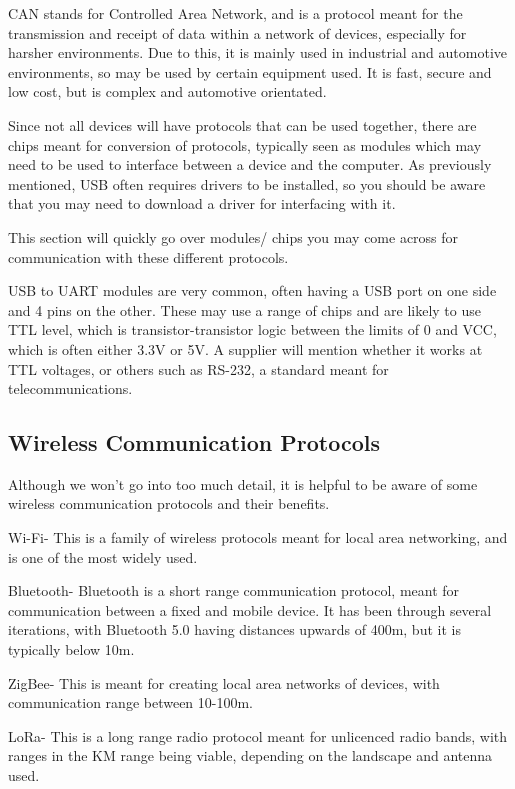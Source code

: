 \documentclass[a4paper,11pt]{report}
\begin{document}
CAN stands for Controlled Area Network, and is a protocol meant for the transmission and receipt of data within a network of devices, especially for harsher environments. Due to this, it is mainly used in industrial and automotive environments, so may be used by certain equipment used. It is fast, secure and low cost, but is complex and automotive orientated.


Since not all devices will have protocols that can be used together, there are chips meant for conversion of protocols, typically seen as modules which may need to be used to interface between a device and the computer. As previously mentioned, USB often requires drivers to be installed, so you should be aware that you may need to download a driver for interfacing with it.


This section will quickly go over modules/ chips you may come across for communication with these different protocols.

USB to UART modules are very common, often having a USB port on one side and 4 pins on the other. These may use a range of chips and are likely to use TTL level, which is transistor-transistor logic between the limits of 0 and VCC, which is often either 3.3V or 5V. A supplier will mention whether it works at TTL voltages, or others such as RS-232, a standard meant for telecommunications.

\subsection{Wireless Communication Protocols}

Although we won't go into too much detail, it is helpful to be aware of some wireless communication protocols and their benefits.

Wi-Fi- This is a family of wireless protocols meant for local area networking, and is one of the most widely used.

Bluetooth- Bluetooth is a short range communication protocol, meant for communication between a fixed and mobile device. It has been through several iterations, with Bluetooth 5.0 having distances upwards of 400m, but it is typically below 10m.

ZigBee- This is meant for creating local area networks of devices, with communication range between 10-100m.

LoRa- This is a long range radio protocol meant for unlicenced radio bands, with ranges in the KM range being viable, depending on the landscape and antenna used.
\end{document}
